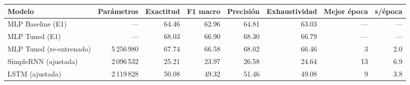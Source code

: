\begin{tabular}{lrrrrrrr}
\toprule
Modelo & Parámetros & Exactitud & F1 macro & Precisión & Exhaustividad & Mejor época & s/época \\
\midrule
MLP Baseline (E1) & — & 64.46 & 62.96 & 64.81 & 63.03 & — & — \\
MLP Tuned (E1) & — & 68.03 & 66.90 & 68.30 & 66.79 & — & — \\
MLP Tuned (re-entrenado) & 5\,256\,980 & 67.74 & 66.58 & 68.02 & 66.46 & 3 & 2.0 \\
SimpleRNN (ajustada) & 2\,096\,532 & 25.21 & 23.97 & 26.58 & 24.64 & 13 & 6.9 \\
LSTM (ajustada) & 2\,119\,828 & 50.08 & 49.32 & 51.46 & 49.08 & 9 & 3.8 \\
\bottomrule
\end{tabular}
